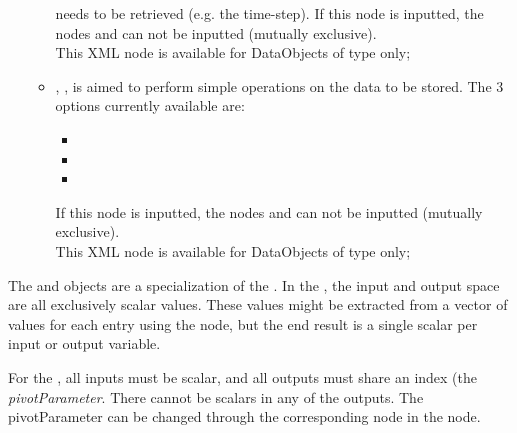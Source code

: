 \begin{itemize}
\begin{itemize}
        needs to be retrieved (e.g. the time-step). If this node is inputted, the nodes
          and   can not be inputted (mutually exclusive).
       \\\nb This XML node is available for DataObjects of type  only;
    \item {}, , is aimed to perform
         simple operations on the data to be stored.
         The 3 options currently available are:
         \begin{itemize}
            \item {}
            \item {}
            \item {}
         \end{itemize}
         If this node is inputted, the nodes
          and   can not be inputted (mutually exclusive).
         \\\nb This XML node is available for DataObjects of type  only;
   \end{itemize}

\end{itemize}

The   and   objects are a specialization of the  . In
the , the input and output space are all exclusively scalar values.  These values might be
extracted from a vector of values for each entry using the  node, but the end result is a
single scalar per input or output variable.

For the , all inputs must be scalar, and all outputs must share an index (the
\textit{pivotParameter}.  There cannot be scalars in any of the outputs. The pivotParameter can be changed
through the corresponding node in the  node.


